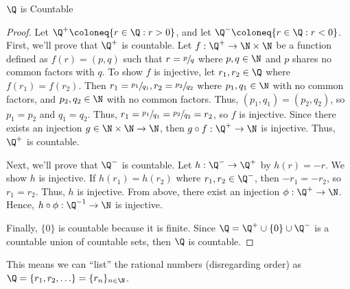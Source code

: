 \begin{thmbox}{$\Q$ is Countable}{}
    \begin{proof}
        Let $\Q^+ \coloneq \{r \in \Q : r > 0\}$, and let $\Q^- \coloneq \{ r \in \Q : r < 0 \}$. First, we'll prove that $\Q^+$ is countable. Let $f : \Q^+ \to \N \times \N$ be a function defined as $f(r) = (p,q)$ such that $r = \sfrac{p}{q}$ where $p,q \in \N$ and $p$ shares no common factors with $q$. To show $f$ is injective, let $r_1, r_2 \in \Q$ where  $f(r_1) = f(r_2)$. Then $r_1 = \sfrac{p_1}{q_1}, r_2 = \sfrac{p_2}{q_2}$ where $p_1, q_1 \in \N$ with no common factors, and $p_2, q_2 \in \N$ with no common factors. Thus, $(p_1,q_1) = (p_2, q_2)$, so $p_1 = p_2$ and $q_1 = q_2$. Thus, $r_1 = \sfrac{p_1}{q_1} = \sfrac{p_2}{q_2} = r_2$, so $f$ is injective. Since there exists an injection $g \in \N \times \N \to \N$, then $g \circ f : \Q^+ \to \N$ is injective. Thus, $\Q^+$ is countable.

        Next, we'll prove that $\Q^-$ is countable. Let $h : \Q^- \to \Q^+$ by $h(r) = -r$. We show $h$ is injective. If $h(r_1) = h(r_2)$ where $r_1, r_2 \in \Q^-$, then $-r_1 = -r_2$, so $r_1 = r_2$. Thus, $h$ is injective. From above, there exist an injection $\phi : \Q^+ \to \N$. Hence, $h \circ \phi : \Q^{-1} \to \N$ is injective.

        Finally, $\{0\}$ is countable because it is finite. Since $\Q = \Q^+ \cup \{0\} \cup \Q^-$ is a countable union of countable sets, then $\Q$ is countable.
    \end{proof}
\end{thmbox}

This means we can ``list'' the rational numbers (disregarding order) as $\Q = \{r_1, r_2, \ldots\} = \{r_n\}_{n \in \N}$.

